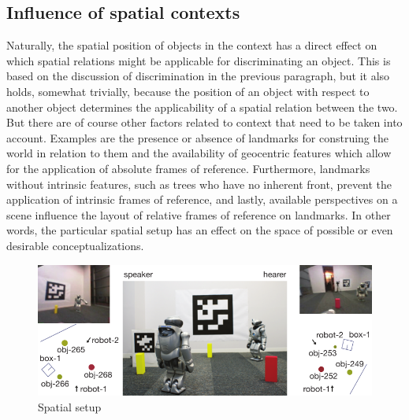 \subsection{Influence of spatial contexts}
Naturally, the spatial position of objects in the context has a
direct effect on which spatial relations might be applicable for
discriminating an object. This is based on
the discussion of discrimination in the previous paragraph, 
but it also holds, somewhat trivially, because the position of an 
object with respect to another object determines the applicability 
of a spatial relation between the two. But there are of course other factors
related to context that need to be taken into account.
Examples are the presence or absence of landmarks for construing the world
in relation to them and the availability of geocentric
features which allow for the application of absolute frames of 
reference. Furthermore, landmarks without intrinsic features, such 
as trees who have no inherent front, 
prevent the application of intrinsic frames of reference, and lastly, available perspectives on a scene influence the layout
of relative frames of reference on landmarks. In other words,
the particular spatial setup has an effect on the 
space of possible or even desirable conceptualizations.

\begin{figure}
\begin{centering}
\includegraphics[width=.8\columnwidth]{figs/space-scene-2-small}
\end{centering}
\caption[Spatial setup example]
{Spatial setup}
\label{f:space-scene-2}
\end{figure}

